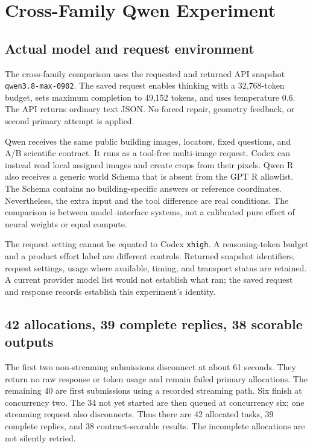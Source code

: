 \section{Cross-Family Qwen Experiment}\label{app:F}
\subsection{Actual model and request environment}
The cross-family comparison uses the requested and returned API snapshot \texttt{qwen3.8-max-0902}. The saved request enables thinking with a 32,768-token budget, sets maximum completion to 49,152 tokens, and uses temperature 0.6. The API returns ordinary text JSON. No forced repair, geometry feedback, or second primary attempt is applied.

Qwen receives the same public building images, locators, fixed questions, and A/B scientific contract. It runs as a tool-free multi-image request. Codex can instead read local assigned images and create crops from their pixels. Qwen R also receives a generic world Schema that is absent from the GPT R allowlist. The Schema contains no building-specific answers or reference coordinates. Nevertheless, the extra input and the tool difference are real conditions. The comparison is between model--interface systems, not a calibrated pure effect of neural weights or equal compute.

The request setting cannot be equated to Codex \texttt{xhigh}. A reasoning-token budget and a product effort label are different controls. Returned snapshot identifiers, request settings, usage where available, timing, and transport status are retained. A current provider model list would not establish what ran; the saved request and response records establish this experiment's identity.

\subsection{42 allocations, 39 complete replies, 38 scorable outputs}
The first two non-streaming submissions disconnect at about 61 seconds. They return no raw response or token usage and remain failed primary allocations. The remaining 40 are first submissions using a recorded streaming path. Six finish at concurrency two. The 34 not yet started are then queued at concurrency six; one streaming request also disconnects. Thus there are 42 allocated tasks, 39 complete replies, and 38 contract-scorable results. The incomplete allocations are not silently retried.

